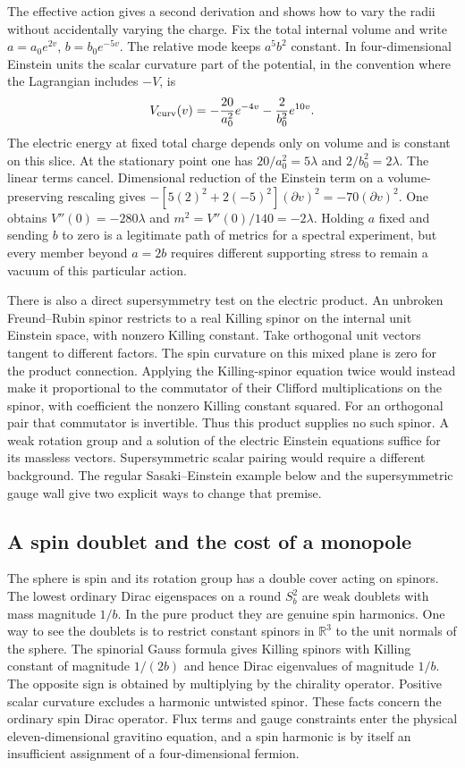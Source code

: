 \documentclass[aps,prd,reprint,onecolumn,nofootinbib,amsmath,amssymb]{revtex4-2}
\begin{document}
The effective action gives a second derivation and shows how to vary the radii without accidentally varying the charge. Fix the total internal volume and write $a=a_0e^{2v}$, $b=b_0e^{-5v}$. The relative mode keeps $a^5b^2$ constant. In four-dimensional Einstein units the scalar curvature part of the potential, in the convention where the Lagrangian includes $-V$, is
\begin{equation}
 V_{\rm curv}(v)=-\frac{20}{a_0^2}e^{-4v}
                   -\frac{2}{b_0^2}e^{10v}.
\end{equation}
The electric energy at fixed total charge depends only on volume and is constant on this slice. At the stationary point one has $20/a_0^2=5\lambda$ and $2/b_0^2=2\lambda$. The linear terms cancel. Dimensional reduction of the Einstein term on a volume-preserving rescaling gives $-[5(2)^2+2(-5)^2](\partial v)^2=-70(\partial v)^2$. One obtains $V''(0)=-280\lambda$ and $m^2=V''(0)/140=-2\lambda$. Holding $a$ fixed and sending $b$ to zero is a legitimate path of metrics for a spectral experiment, but every member beyond $a=2b$ requires different supporting stress to remain a vacuum of this particular action.

There is also a direct supersymmetry test on the electric product. An unbroken Freund--Rubin spinor restricts to a real Killing spinor on the internal unit Einstein space, with nonzero Killing constant. Take orthogonal unit vectors tangent to different factors. The spin curvature on this mixed plane is zero for the product connection. Applying the Killing-spinor equation twice would instead make it proportional to the commutator of their Clifford multiplications on the spinor, with coefficient the nonzero Killing constant squared. For an orthogonal pair that commutator is invertible. Thus this product supplies no such spinor. A weak rotation group and a solution of the electric Einstein equations suffice for its massless vectors. Supersymmetric scalar pairing would require a different background. The regular Sasaki--Einstein example below and the supersymmetric gauge wall give two explicit ways to change that premise.

\subsection{A spin doublet and the cost of a monopole}
The sphere is spin and its rotation group has a double cover acting on spinors. The lowest ordinary Dirac eigenspaces on a round $S^2_b$ are weak doublets with mass magnitude $1/b$. In the pure product they are genuine spin harmonics. One way to see the doublets is to restrict constant spinors in $\mathbb R^3$ to the unit normals of the sphere. The spinorial Gauss formula gives Killing spinors with Killing constant of magnitude $1/(2b)$ and hence Dirac eigenvalues of magnitude $1/b$. The opposite sign is obtained by multiplying by the chirality operator. Positive scalar curvature excludes a harmonic untwisted spinor. These facts concern the ordinary spin Dirac operator. Flux terms and gauge constraints enter the physical eleven-dimensional gravitino equation, and a spin harmonic is by itself an insufficient assignment of a four-dimensional fermion.
\end{document}
